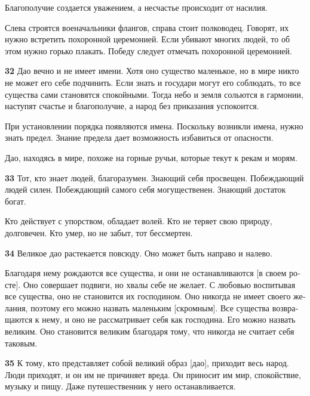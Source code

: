 \documentclass[a4paper]{article}
\begin{document}
{
Благополучие создается уважением, а несчастье происходит от насилия.}

{
Слева строятся военачальники флангов, справа стоит полководец. Говорят, их нужно встретить похоронной церемонией. Если
убивают многих людей, то об этом нужно горько плакать. Победу следует отмечать похоронной церемонией.}

{\ttfamily
\foreignlanguage{russian}{\textrm{\textbf{32}}}\foreignlanguage{russian}{\textrm{ Дао вечно и не имеет имени. Хотя оно
существо маленькое, но в мире никто не может его себе подчинить. Если знать и государи могут его соблюдать, то все
существа сами становятся спокойными. Тогда небо и земля сольются в гармонии, наступят счастье и благополучие, а народ
без приказания успокоится.}}}

{
При установлении порядка появляются имена. Поскольку возникли имена, нужно знать предел. Знание предела дает возможность
избавиться от опасности.}

{
Дао, находясь в мире, похоже на горные ручьи, которые текут к рекам и морям.}

{\ttfamily
\foreignlanguage{russian}{\textrm{\textbf{33}}}\foreignlanguage{russian}{\textrm{ Тот, кто знает людей, благоразумен.
Знающий себя просвещен. Побеждающий людей силен. Побеждающий самого себя могущественен. Знающий достаток богат.}}}

{
Кто действует с упорством, обладает волей. Кто не теряет свою природу, долговечен. Кто умер, но не забыт, тот
бессмертен.}

{\ttfamily
\foreignlanguage{russian}{\textrm{\textbf{34}}}\foreignlanguage{russian}{\textrm{ Великое дао растекается повсюду. Оно
может быть направо и налево.}}}

{\ttfamily
\foreignlanguage{russian}{\textrm{Благодаря нему рождаются все существа, и они не останавливаются [в своем росте]. Оно
совершает подвиги, но хвалы себе не желает. С любовью воспитывая все существа, оно не становится их господином. Оно
никогда не имеет своего желания, поэтому его можно назвать маленьким [скромным]. Все существа возвращаются к нему, и
оно не рассматривает себя как господина. Его можно назвать великим. Оно становится великим благодаря тому, что никогда
не считает себя таковым.}}}

{\ttfamily
\foreignlanguage{russian}{\textrm{\textbf{35}}}\foreignlanguage{russian}{\textrm{ К тому, кто представляет собой великий
образ [дао], приходит весь народ. Люди приходят, и он им не причиняет вреда. Он приносит им мир, спокойствие, музыку и
пищу. Даже путешественник у него останавливается.}}}
\end{document}
